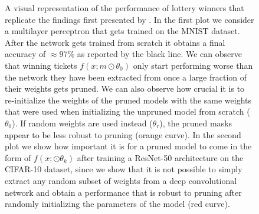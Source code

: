 \begin{figure}[ht!]


    \caption{A visual representation of the performance of lottery winners that replicate the findings first presented by \citet{frankle2018lottery}. In the first plot we consider a multilayer perceptron that gets trained on the MNIST dataset. After the network gets trained from scratch it obtains a final accuracy of $\approx 97\%$ as reported by the black line. We can observe that winning tickets $f(x;m\odot\theta_0)$ only start performing worse than the network they have been extracted from once a large fraction of their weights gets pruned. We can also observe how crucial it is to re-initialize the weights of the pruned models with the same weights that were used when initializing the unpruned model from scratch ($\theta_0$). If random weights are used instead ($\theta_r$), the pruned masks appear to be less robust to pruning (orange curve). In the second plot we show how important it is for a pruned model to come in the form of $f(x;\odot\theta_k)$ after training a ResNet-50 architecture on the CIFAR-10 dataset, since we show that it is not possible to simply extract any random subset of weights from a deep convolutional network and obtain a performance that is robust to pruning after randomly initializing the parameters of the model (red curve).}
    \label{fig:original_lth_results}
\end{figure} 
